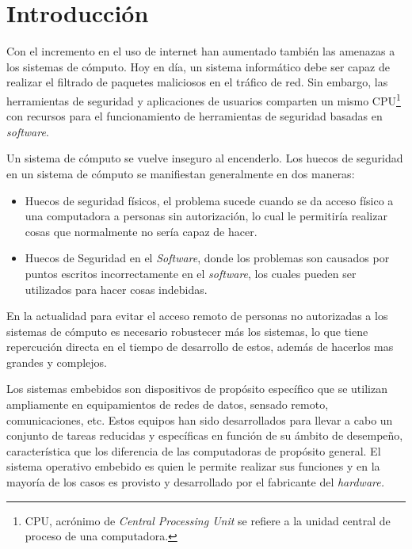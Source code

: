 \chapter{Introducción}

Con el incremento en el uso de internet han aumentado también las amenazas a los
sistemas de cómputo. Hoy en día, un sistema informático debe ser capaz de
realizar el filtrado de paquetes maliciosos en el tráfico de red. Sin embargo,
las herramientas de seguridad y aplicaciones de usuarios comparten un mismo
CPU\footnote{CPU, acrónimo de \emph{Central Processing Unit} se refiere a la
unidad central de proceso de una computadora.} con recursos para el
funcionamiento de herramientas de seguridad basadas
en \emph{software}.


Un sistema de cómputo se vuelve inseguro al encenderlo. Los huecos de
seguridad en un sistema de cómputo se manifiestan generalmente en
dos maneras:

\begin{itemize}
 \item Huecos de seguridad físicos, el problema sucede cuando se da
acceso  físico a una computadora a personas sin autorización, lo cual
le permitiría  realizar cosas que normalmente no sería capaz de hacer.
 \item Huecos de Seguridad en el \emph{Software}, donde los problemas son
causados por  puntos escritos incorrectamente en el \emph{software}, los cuales
pueden ser  utilizados para hacer cosas indebidas.
\end{itemize}

En la actualidad para evitar el acceso remoto de personas no
autorizadas a los sistemas  de c\'omputo es necesario robustecer más
los sistemas, lo que tiene repercución directa en el tiempo de
desarrollo de estos, además de hacerlos mas grandes y complejos.

Los sistemas embebidos son dispositivos de propósito específico que se utilizan
ampliamente en equipamientos de redes de datos, sensado remoto, comunicaciones,
etc. Estos equipos han sido desarrollados para llevar a cabo un conjunto de
tareas reducidas y específicas en función de su ámbito de desempeño,
característica que los diferencia de las computadoras de propósito general. El
sistema operativo embebido es quien le permite realizar sus funciones y en la
mayoría de los casos es provisto y desarrollado por el fabricante del
\emph{hardware.}


